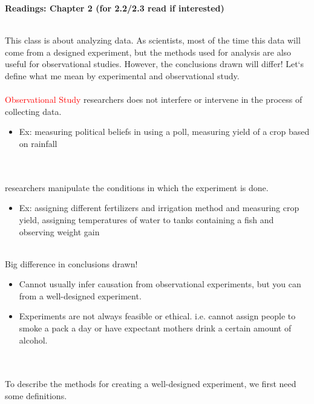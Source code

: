 \begin{center}\large\textbf{Readings: Chapter 2 (for 2.2/2.3 read if interested)}\\
\normalsize \end{center}
\large ~\hrulefill
~\\
\normalsize This class is about analyzing data.  As scientists, most of the time this data will come from a designed experiment, but the methods used for analysis are also useful for observational studies.  However, the conclusions drawn will differ!  Let`s define what me mean by experimental and observational study.\\~\\

\textcolor{red}{Observational Study}
researchers does not interfere or intervene in the process of collecting data. 
\begin{itemize}
\item Ex: measuring political beliefs in using a poll, measuring yield of a crop based on rainfall\\~\\~\\
\end{itemize}
\underbar{~~~~~~~~~~~~~~~~~~~~~~~~~~~~~~~~~~~~} researchers manipulate the conditions in which the experiment is done. 
\begin{itemize}
\item Ex: assigning different fertilizers and irrigation method and measuring crop yield, assigning temperatures of water to tanks containing a fish and observing weight gain
\end{itemize}
~\\
Big difference in conclusions drawn!
\begin{itemize}
\item Cannot usually infer causation from observational experiments, but you can from a well-designed experiment.
\item Experiments are not always feasible or ethical.  i.e. cannot assign people to smoke a pack a day or have expectant mothers drink a certain amount of alcohol.
\end{itemize}
~\\~\\
To describe the methods for creating a well-designed experiment, we first need some definitions.

